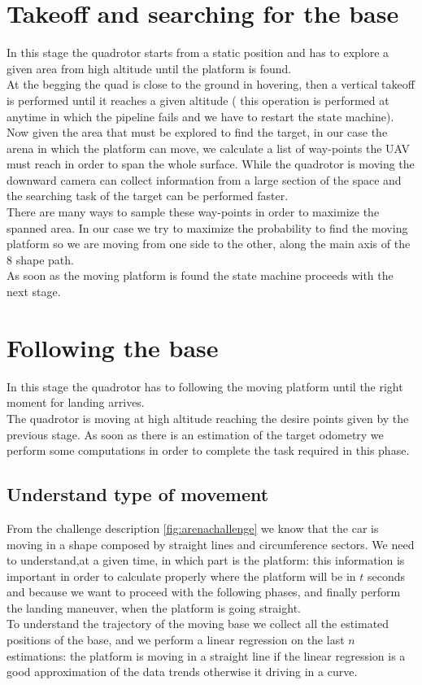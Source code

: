 \section{Takeoff and searching for the base}
In this stage the quadrotor starts from a static position and has to explore a given area from high altitude until the platform is found.\\

At the begging the quad is close to the ground in hovering, then a vertical takeoff is performed until it reaches a given altitude ( this operation is performed at anytime in which the pipeline fails and we have to restart the state machine).\\
Now given the area that must be explored to find the target, in our case the arena in which the platform can move, we calculate a list of way-points the UAV must reach in order to span the whole surface. While the quadrotor is moving the downward camera can collect information from a large section of the space and the searching task of the target can be performed faster.\\
There are many ways to sample these way-points in order to maximize the spanned area. In our case we try to maximize the probability to find the moving platform so we are moving from one side to the other, along the main axis of the 8 shape path.\\
As soon as the moving platform is found the state machine proceeds with the next stage.

\section{Following the base}
In this stage the quadrotor has to following the moving platform until the right moment for landing arrives.\\

The quadrotor is moving at high altitude reaching the desire points given by the previous stage.  As soon as there is an estimation of the target odometry we perform some computations in order to complete the task required in this phase.

\subsection{Understand type of movement}
From the challenge description \ref{fig:arenachallenge} we know that the car is moving in a shape composed by straight lines and circumference sectors. We need to understand,at a given time, in which part is the platform: this information is important in order to calculate properly where the platform will be in $t$ seconds and because we want to proceed with the following phases, and finally perform the landing maneuver, when the platform is going straight.\\
To understand the trajectory of the moving base we collect all the estimated positions of the base, and we perform a linear regression on the last $n$ estimations: the platform is moving in a straight line if the linear regression is a good approximation of the data trends otherwise it driving in a curve.\\


